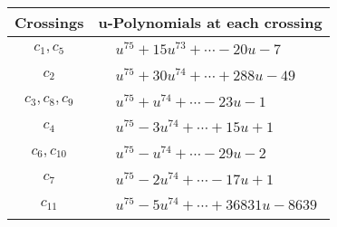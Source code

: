 \documentclass[1p]{elsarticle_modified}
\theoremstyle{definition}
\begin{document}
\begin{tabular}{m{50pt}|m{274pt}}
Crossings & \hspace{64pt}u-Polynomials at each crossing \\
\hline $$\begin{aligned}c_{1},c_{5}\end{aligned}$$&$\begin{aligned}
&u^{75}+15 u^{73}+\cdots-20 u-7
\end{aligned}$\\
\hline $$\begin{aligned}c_{2}\end{aligned}$$&$\begin{aligned}
&u^{75}+30 u^{74}+\cdots+288 u-49
\end{aligned}$\\
\hline $$\begin{aligned}c_{3},c_{8},c_{9}\end{aligned}$$&$\begin{aligned}
&u^{75}+u^{74}+\cdots-23 u-1
\end{aligned}$\\
\hline $$\begin{aligned}c_{4}\end{aligned}$$&$\begin{aligned}
&u^{75}-3 u^{74}+\cdots+15 u+1
\end{aligned}$\\
\hline $$\begin{aligned}c_{6},c_{10}\end{aligned}$$&$\begin{aligned}
&u^{75}- u^{74}+\cdots-29 u-2
\end{aligned}$\\
\hline $$\begin{aligned}c_{7}\end{aligned}$$&$\begin{aligned}
&u^{75}-2 u^{74}+\cdots-17 u+1
\end{aligned}$\\
\hline $$\begin{aligned}c_{11}\end{aligned}$$&$\begin{aligned}
&u^{75}-5 u^{74}+\cdots+36831 u-8639
\end{aligned}$\\
\hline
\end{tabular}\\~\\
\newpage\renewcommand{\arraystretch}{1}
\end{document}
